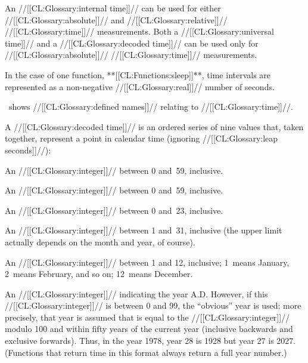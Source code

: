 An //[[CL:Glossary:internal time]]// can be used 
  for either //[[CL:Glossary:absolute]]// and //[[CL:Glossary:relative]]// //[[CL:Glossary:time]]// measurements.
Both a //[[CL:Glossary:universal time]]// and a //[[CL:Glossary:decoded time]]// can be used 
  only for //[[CL:Glossary:absolute]]// //[[CL:Glossary:time]]// measurements.

In the case of one function, **[[CL:Functions:sleep]]**,
time intervals are represented as a non-negative //[[CL:Glossary:real]]// number of seconds.

\Thenextfigure\ shows //[[CL:Glossary:defined names]]// relating to //[[CL:Glossary:time]]//.





A //[[CL:Glossary:decoded time]]// is an ordered series of nine values that, taken together,
represent a point in calendar time (ignoring //[[CL:Glossary:leap seconds]]//):


\beginlist
{}

An //[[CL:Glossary:integer]]// between 0 and~59, inclusive.



An //[[CL:Glossary:integer]]// between 0 and~59, inclusive.



An //[[CL:Glossary:integer]]// between 0 and~23, inclusive.



An //[[CL:Glossary:integer]]// between 1 and~31, inclusive (the upper limit actually
depends on the month and year, of course).



An //[[CL:Glossary:integer]]// between 1 and 12, inclusive;
1~means January, 2~means February, and so on; 12~means December.



An //[[CL:Glossary:integer]]// indicating the year A.D.  However, if this 
//[[CL:Glossary:integer]]//
is between 0 and 99, the ``obvious'' year is used; more precisely,
that year is assumed that is equal to the 
//[[CL:Glossary:integer]]// modulo 100 and
within fifty years of the current year (inclusive backwards
and exclusive forwards).  
Thus, in the year 1978, year 28 is 1928
but year 27 is 2027.  (Functions that return time in this format always return
a full year number.) 


